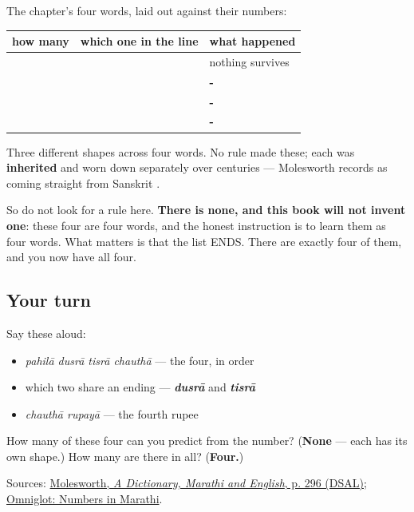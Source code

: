 \begin{grammarlens}[title={Grammar Lens: four words, three shapes, no rule}]
The chapter's four words, laid out against their numbers:

\noindent
\begin{tabularx}{\linewidth}{@{}>{\raggedright\arraybackslash}X>{\raggedright\arraybackslash}X>{\raggedright\arraybackslash}X@{}}
\toprule
\textbf{how many} & \textbf{which one in the line} & \textbf{what happened} \\
\midrule
\textbf{\mr{एक}} & \textbf{\mr{पहिला}} & nothing survives \\
\textbf{\mr{दोन}} & \textbf{\mr{दुसरा}} & \textbf{-\mr{सरा}} \\
\textbf{\mr{तीन}} & \textbf{\mr{तिसरा}} & \textbf{-\mr{सरा}} \\
\textbf{\mr{चार}} & \textbf{\mr{चौथा}} & \textbf{-\mr{था}} \\
\bottomrule
\end{tabularx}

Three different shapes across four words. No rule made these; each was \textbf{inherited} and worn down separately over centuries — Molesworth records \textbf{} as coming straight from Sanskrit \textbf{}.

So do not look for a rule here. \textbf{There is none, and this book will not invent one}: these four are four words, and the honest instruction is to learn them as four words. What matters is that the list ENDS. There are exactly four of them, and you now have all four.
\end{grammarlens}

\subsection*{Your turn}
Say these aloud:

\begin{itemize}
\raggedright
  \item \emph{pahilā dusrā tisrā chauthā} — the four, in order
  \item which two share an ending — \emph{\textbf{dusrā}} and \emph{\textbf{tisrā}}
  \item \emph{chauthā rupayā} — the fourth rupee
\end{itemize}

\begin{tcolorbox}[breakable,colback=teal!4,colframe=teal!35!black,title={Before you move on}]
How many of these four can you predict from the number? (\textbf{None} — each has its own shape.) How many are there in all? (\textbf{Four.})

Sources: \href{https://dsal.uchicago.edu/cgi-bin/app/molesworth\_query.py?qs=\%E0\%A4\%9A\%E0\%A5\%8C\%E0\%A4\%A5\%E0\%A4\%BE\&searchhws=yes}{Molesworth, \emph{A Dictionary, Marathi and English}, p. 296 (DSAL)}; \href{https://www.omniglot.com/language/numbers/marathi.htm}{Omniglot: Numbers in Marathi}.
\end{tcolorbox}
